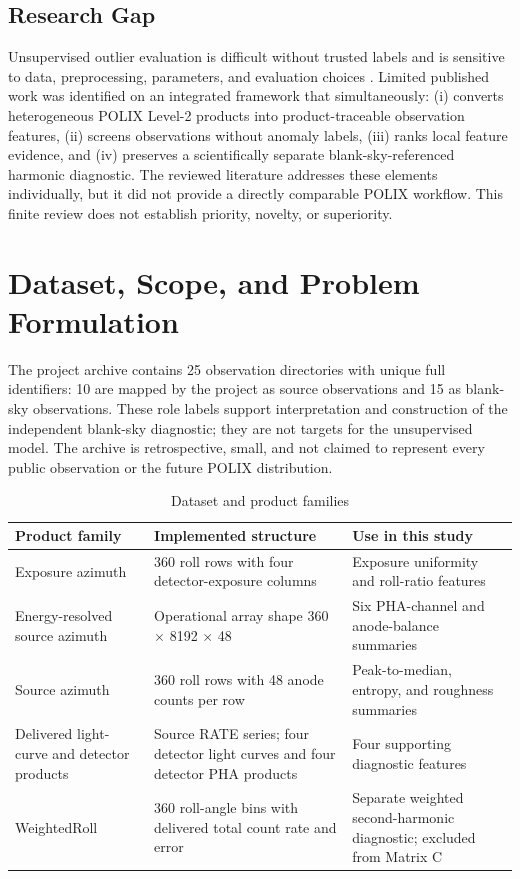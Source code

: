 \documentclass[conference]{IEEEtran}
\begin{document}
\subsection{Research Gap}

Unsupervised outlier evaluation is difficult without trusted labels and is sensitive to data, preprocessing, parameters, and evaluation choices \cite{campos2016evaluation}. Limited published work was identified on an integrated framework that simultaneously: (i) converts heterogeneous POLIX Level-2 products into product-traceable observation features, (ii) screens observations without anomaly labels, (iii) ranks local feature evidence, and (iv) preserves a scientifically separate blank-sky-referenced harmonic diagnostic. The reviewed literature addresses these elements individually, but it did not provide a directly comparable POLIX workflow. This finite review does not establish priority, novelty, or superiority.


\section{Dataset, Scope, and Problem Formulation}

The project archive contains 25 observation directories with unique full identifiers: 10 are mapped by the project as source observations and 15 as blank-sky observations. These role labels support interpretation and construction of the independent blank-sky diagnostic; they are not targets for the unsupervised model. The archive is retrospective, small, and not claimed to represent every public observation or the future POLIX distribution.


\begin{table}[t]
\centering
\caption{Dataset and product families}
\label{tab:1}
\footnotesize
\begin{tabular}{p{}p{}p{}}
\toprule
Product family & Implemented structure & Use in this study \\
\midrule
Exposure azimuth & 360 roll rows with four detector-exposure columns & Exposure uniformity and roll-ratio features \\
Energy-resolved source azimuth & Operational array shape 360 $\times$ 8192 $\times$ 48 & Six PHA-channel and anode-balance summaries \\
Source azimuth & 360 roll rows with 48 anode counts per row & Peak-to-median, entropy, and roughness summaries \\
Delivered light-curve and detector products & Source RATE series; four detector light curves and four detector PHA products & Four supporting diagnostic features \\
WeightedRoll & 360 roll-angle bins with delivered total count rate and error & Separate weighted second-harmonic diagnostic; excluded from Matrix C \\
\bottomrule
\end{tabular}
\end{table}
\end{document}

